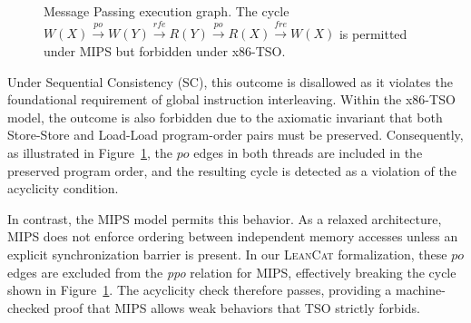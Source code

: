 \begin{figure}[ht]
\centering
{}
\caption{Message Passing execution graph. The cycle $W(X) \xrightarrow{\mathit{po}} W(Y) \xrightarrow{\mathit{rfe}} R(Y) \xrightarrow{\mathit{po}} R(X) \xrightarrow{\mathit{fre}} W(X)$ is permitted under MIPS but forbidden under x86-TSO.}
\label{fig:mp-rfe-cycle}
\end{figure}

Under Sequential Consistency (SC), this outcome is disallowed as it violates the foundational requirement of global instruction interleaving. Within the x86-TSO model, the outcome is also forbidden due to the axiomatic invariant that both Store-Store and Load-Load program-order pairs must be preserved. Consequently, as illustrated in Figure~\ref{fig:mp-rfe-cycle}, the $\mathit{po}$ edges in both threads are included in the preserved program order, and the resulting cycle is detected as a violation of the acyclicity condition.

In contrast, the MIPS model permits this behavior. As a relaxed architecture, MIPS does not enforce ordering between independent memory accesses unless an explicit synchronization barrier is present. In our \textsc{LeanCat} formalization, these $\mathit{po}$ edges are excluded from the \textit{ppo} relation for MIPS, effectively breaking the cycle shown in Figure~\ref{fig:mp-rfe-cycle}. The acyclicity check therefore passes, providing a machine-checked proof that MIPS allows weak behaviors that TSO strictly forbids.

